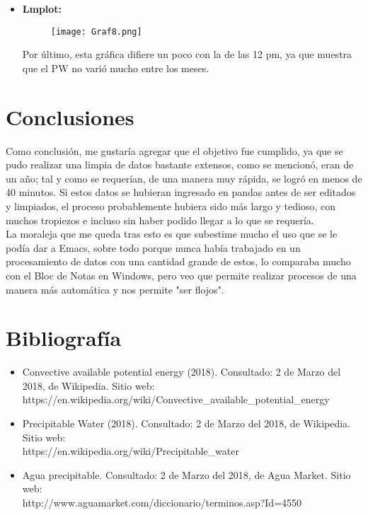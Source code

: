 \documentclass[a4paper]{article}
\begin{document}
\begin{itemize}
\begin{itemize}
\item \textbf{Lmplot:}\\
\begin{figure}[h!]
  \texttt{[image: Graf8.png]}
  \centering
  \label{fig:G8}
\end{figure}

Por último, esta gráfica difiere un poco con la de las 12 pm, ya que muestra que el PW no varió mucho entre los meses. 

\end{itemize}
\end{itemize}


\section{Conclusiones}

Como conclusión, me gustaría agregar que el objetivo fue cumplido, ya que se pudo realizar una limpia de datos bastante extensos, como se mencionó, eran de un año; tal y como se requerían, de una manera muy rápida, se logró en menos de 40 minutos. Si estos datos se hubieran ingresado en pandas antes de ser editados y limpiados, el proceso probablemente hubiera sido más largo y tedioso, con muchos tropiezos e incluso sin haber podido llegar a lo que se requería. \\

La moraleja que me queda tras esto es que subestime mucho el uso que se le podía dar a Emacs, sobre todo porque nunca había trabajado en un procesamiento de datos con una cantidad grande de estos, lo comparaba mucho con el Bloc de Notas en Windows, pero veo que permite realizar procesos de una manera más automática y nos permite "ser flojos".

\section{Bibliografía}
\begin{itemize}
\item Convective available potential energy (2018). Consultado: 2 de Marzo del 2018, de Wikipedia. Sitio web: https://en.wikipedia.org/wiki/Convective\_available\_potential\_energy
\item Precipitable Water (2018). Consultado: 2 de Marzo del 2018, de Wikipedia. Sitio web:\\ https://en.wikipedia.org/wiki/Precipitable\_water
\item Agua precipitable. Consultado: 2 de Marzo del 2018, de Agua Market. Sitio web: \\ http://www.aguamarket.com/diccionario/terminos.asp?Id=4550
\end{itemize}
\end{document}

